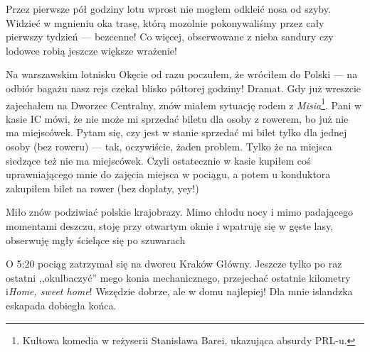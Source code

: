 Przez pierwsze pół godziny lotu wprost nie mogłem odkleić nosa od szyby. Widzieć w mgnieniu oka trasę, którą mozolnie pokonywaliśmy przez cały pierwszy tydzień --- bezcenne! Co więcej, obserwowane z nieba sandury czy lodowce robią jeszcze większe wrażenie!

Na warszawskim lotnisku Okęcie od razu poczułem, że wróciłem do Polski --- na odbiór bagażu nasz rejs czekał blisko półtorej godziny! Dramat. Gdy już wreszcie zajechałem na Dworzec Centralny, znów miałem sytuację rodem z \emph{Misia}\footnote{Kultowa komedia w reżyserii Stanisława Barei, ukazująca absurdy PRL-u.}. Pani w kasie IC mówi, że nie może mi sprzedać biletu dla osoby z rowerem, bo już nie ma miejscówek. Pytam się, czy jest w stanie sprzedać mi bilet tylko dla jednej osoby (bez roweru) --- tak, oczywiście, żaden problem. Tylko że na miejsca siedzące też nie ma miejscówek. Czyli ostatecznie w kasie kupiłem coś uprawniającego mnie do zajęcia miejsca w pociągu, a potem u konduktora zakupiłem bilet na rower (bez dopłaty, yey!)

Miło znów podziwiać polskie krajobrazy. Mimo chłodu nocy i mimo padającego momentami deszczu, stoję przy otwartym oknie i wpatruję się w gęste lasy, obserwuję mgły ścielące się po szuwarach\textellipsis

O 5:20 pociąg zatrzymał się na dworcu Kraków Główny. Jeszcze tylko po raz ostatni ,,okulbaczyć'' mego konia mechanicznego, przejechać ostatnie kilometry i\textellipsis \emph{Home, sweet home}! Wszędzie dobrze, ale w domu najlepiej! Dla mnie islandzka eskapada dobiegła końca.

